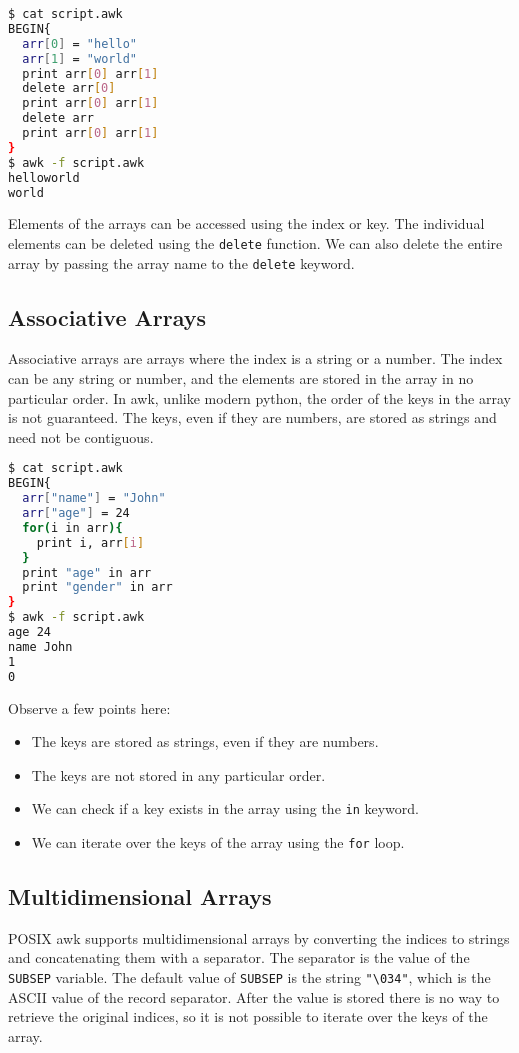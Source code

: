 \begin{lstlisting}[language=bash]
$ cat script.awk
BEGIN{
  arr[0] = "hello"
  arr[1] = "world"
  print arr[0] arr[1]
  delete arr[0]
  print arr[0] arr[1]
  delete arr
  print arr[0] arr[1]
}
$ awk -f script.awk
helloworld
world

\end{lstlisting}

Elements of the arrays can be accessed using the index or key.
The individual elements can be deleted using the \lstinline|delete| function.
We can also delete the entire array by passing the array name to the \lstinline|delete| keyword.

\subsection{Associative Arrays}

Associative arrays are arrays where the index is a string or a number. The index can be any string or number, and the elements are stored in the array in no particular order.
In awk, unlike modern python, the order of the keys in the array is not guaranteed.
The keys, even if they are numbers, are stored as strings and need not be contiguous.

\begin{lstlisting}[language=bash]
$ cat script.awk
BEGIN{
  arr["name"] = "John"
  arr["age"] = 24
  for(i in arr){
    print i, arr[i]
  }
  print "age" in arr
  print "gender" in arr
}
$ awk -f script.awk
age 24
name John
1
0
\end{lstlisting}

Observe a few points here:

\begin{itemize}
  \item The keys are stored as strings, even if they are numbers.
  \item The keys are not stored in any particular order.
  \item We can check if a key exists in the array using the \lstinline|in| keyword.
  \item We can iterate over the keys of the array using the \lstinline|for| loop.
\end{itemize}


\subsection{Multidimensional Arrays}

POSIX awk supports multidimensional arrays by converting the indices to strings and concatenating them with a separator. The separator is the value of the \lstinline|SUBSEP| variable. The default value of \lstinline|SUBSEP| is the string \lstinline|"\034"|, which is the ASCII value of the record separator.
After the value is stored there is no way to retrieve the original indices, so it is not possible to iterate over the keys of the array.

